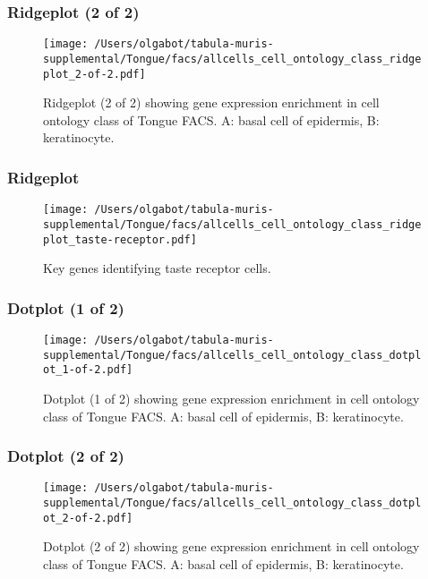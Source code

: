 \clearpage
\clearpage
\subsubsection{Ridgeplot (2 of 2)}
\begin{figure}[h]
\centering
\texttt{[image: /Users/olgabot/tabula-muris-supplemental/Tongue/facs/allcells\_cell\_ontology\_class\_ridgeplot\_2-of-2.pdf]}

\caption{ Ridgeplot (2 of 2)  showing gene expression enrichment in cell ontology class of Tongue FACS. A: basal cell of epidermis, B: keratinocyte.}
\end{figure}


\clearpage
\clearpage
\subsubsection{Ridgeplot}
\begin{figure}[h]
\centering
\texttt{[image: /Users/olgabot/tabula-muris-supplemental/Tongue/facs/allcells\_cell\_ontology\_class\_ridgeplot\_taste-receptor.pdf]}

\caption{Key genes identifying taste receptor cells.
}
\end{figure}


\clearpage
\clearpage
\subsubsection{Dotplot (1 of 2)}
\begin{figure}[h]
\centering
\texttt{[image: /Users/olgabot/tabula-muris-supplemental/Tongue/facs/allcells\_cell\_ontology\_class\_dotplot\_1-of-2.pdf]}

\caption{ Dotplot (1 of 2)  showing gene expression enrichment in cell ontology class of Tongue FACS. A: basal cell of epidermis, B: keratinocyte.}
\end{figure}


\clearpage
\clearpage
\subsubsection{Dotplot (2 of 2)}
\begin{figure}[h]
\centering
\texttt{[image: /Users/olgabot/tabula-muris-supplemental/Tongue/facs/allcells\_cell\_ontology\_class\_dotplot\_2-of-2.pdf]}

\caption{ Dotplot (2 of 2)  showing gene expression enrichment in cell ontology class of Tongue FACS. A: basal cell of epidermis, B: keratinocyte.}
\end{figure}


